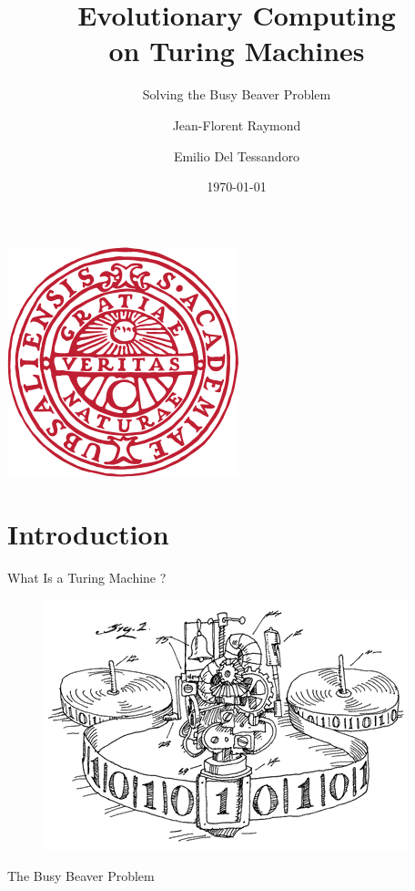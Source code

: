 \documentclass{beamer}
\title{\textbf{Evolutionary Computing \\on Turing Machines}}
\subtitle{Solving the Busy Beaver Problem}
\author{Jean-Florent Raymond \and Emilio Del Tessandoro}
\institute[Uppsala University]{Uppsala University}
\date{\today}
\begin{document}
\begin{frame}
\titlepage
\vspace{-2cm}
\begin{flushright}
\includegraphics[scale=0.3]{figures/uu_logo.png}  
\end{flushright}

\end{frame}

\section{Introduction}

\begin{frame}{What Is a Turing Machine ?}


\begin{figure}
\includegraphics[scale=0.5]{figures/turingMachine.png}
\end{figure}
\end{frame}

\begin{frame}{The Busy Beaver Problem}

\end{frame}
\end{document}
